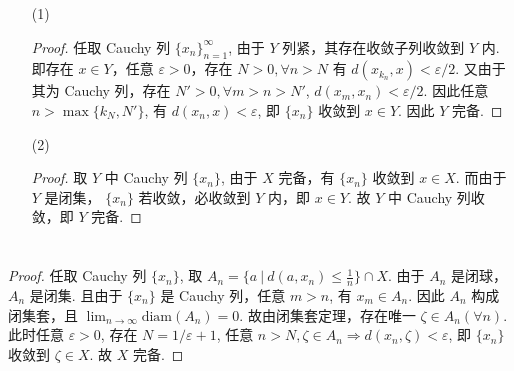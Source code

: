 \documentclass{article}
\begin{document}
\begin{itemize}
    \item [(1)]
    \begin{proof}
        任取 Cauchy 列 $\{x_n\}_{n = 1}^\infty$, 由于 $Y$ 列紧，其存在收敛子列收敛到 $Y$ 内. 即存在 $x \in Y$，任意 $\varepsilon > 0$，存在 $N > 0, \forall n > N$ 有 $d(x_{k_n}, x) < \varepsilon / 2$. 又由于其为 Cauchy 列，存在 $N' > 0, \forall m > n > N'$, $d(x_m, x_n) < \varepsilon / 2$. 因此任意 $n > \max\{k_N, N'\}$, 有 $d(x_n, x) < \varepsilon$, 即 $\{x_n\}$ 收敛到 $x \in Y$. 因此 $Y$ 完备.
    \end{proof}
    \item [(2)]
    \begin{proof}
        取 $Y$ 中 Cauchy 列 $\{x_n\}$, 由于 $X$ 完备，有 $\{x_n\}$ 收敛到 $x \in X$. 而由于 $Y$ 是闭集， $\{x_n\}$ 若收敛，必收敛到 $Y$ 内，即 $x \in Y$. 故 $Y$ 中 Cauchy 列收敛，即 $Y$ 完备.
    \end{proof}
\end{itemize}

\section{}

\begin{proof}
    任取 Cauchy 列 $\{x_n\}$, 取 $A_n = \{a\ |\ d(a, x_n) \leqslant \frac{1}{n}\} \cap X$. 由于 $A_n$ 是闭球，$A_n$ 是闭集. 且由于 $\{x_n\}$ 是 Cauchy 列，任意 $m > n$, 有 $x_m \in A_n$. 因此 $A_n$ 构成闭集套，且 $\lim_{n \to \infty} \mathrm{diam}(A_n) = 0$. 故由闭集套定理，存在唯一 $\zeta \in A_n (\forall n)$. 此时任意 $\varepsilon > 0$, 存在 $N = 1/\varepsilon + 1$, 任意 $n > N, \zeta \in A_n \Rightarrow d(x_n, \zeta) < \varepsilon$, 即 $\{x_n\}$ 收敛到 $\zeta \in X$. 故 $X$ 完备.
\end{proof}
\end{document}
